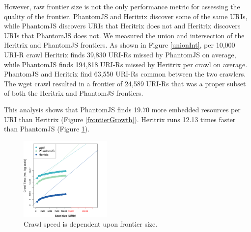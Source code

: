 \documentclass{sig-alternate}
\begin{document}
However, raw frontier size is not the only performance metric for assessing the quality of the frontier. PhantomJS and Heritrix discover some of the same URIs, while PhantomJS discovers URIs that Heritrix does not and Heritrix discovers URIs that PhantomJS does not. We measured the union and intersection of the Heritrix and PhantomJS frontiers. As shown in Figure \ref{unionInt}, per 10,000 URI-R crawl Heritrix finds 39,830 URI-Rs missed by PhantomJS on average, while PhantomJS finds 194,818 URI-Rs missed by Heritrix per crawl on average. PhantomJS and Heritrix find 63,550 URI-Rs common between the two crawlers. The wget crawl resulted in a frontier of 24,589 URI-Rs that was a proper subset of both the Heritrix and PhantomJS frontiers.


This analysis shows that PhantomJS finds 19.70 more embedded resources per URI than Heritrix (Figure \ref{frontierGrowth}). Heritrix runs 12.13 times faster than PhantomJS (Figure \ref{speedGrowth}).%


\begin{figure}[t]
 \begin{center}
    \includegraphics[width=0.4\textwidth,keepaspectratio]{./imgs/predictGrowthFunctionTime2.png}
  \end{center}
  \caption{Crawl speed is dependent upon frontier size.}
  \label{speedGrowth}
\end{figure}
\vskip -3mm

\end{document}
